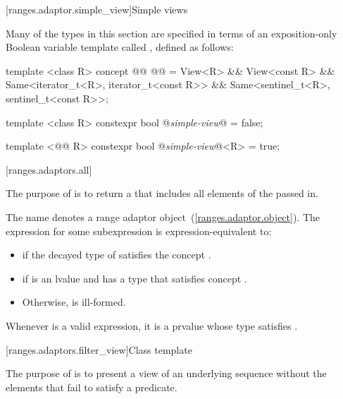 [ranges.adaptor.simple_view]{Simple views}

\pnum
Many of the types in this section are specified in terms of an exposition-only
Boolean variable template called , defined as follows:

\begin{codeblock}
template <class R>
concept @@ @\textit{}@ =
  View<R> && View<const R> &&
  Same<iterator_t<R>, iterator_t<const R>> &&
  Same<sentinel_t<R>, sentinel_t<const R>>;

template <class R>
  constexpr bool @\textit{simple-view}@ = false;

template <@\textit{}@ R>
  constexpr bool @\textit{simple-view}@<R> = true;
\end{codeblock}

[ranges.adaptors.all]{}

\pnum
The purpose of  is to return a  that includes all
elements of the  passed in.

\pnum
The name  denotes a range adaptor
object~(\ref{ranges.adaptor.object}). The expression  for
some subexpression  is expression-equivalent to:

\begin{itemize}
\item {} if the decayed type of 
satisfies the concept .
\item {} if 
is an lvalue and has a type that satisfies concept .
\item Otherwise,  is ill-formed.
\end{itemize}

\remark Whenever  is a valid expression, it is a prvalue
whose type satisfies .

[ranges.adaptors.filter_view]{Class template }

\pnum
The purpose of  is to present a view of an underlying
sequence without the elements that fail to satisfy a predicate.

\pnum
\enterexample
{}
\exitexample

